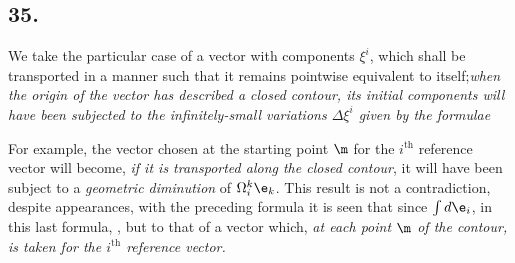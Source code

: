 \subsection*{35.}

We take the particular case of a vector with components $\xi^i$, which shall be transported in a manner such that it remains pointwise equivalent to itself;\textit{when the origin of the vector has described a closed contour, its initial components will have been subjected to the infinitely-small variations $\Delta\xi^i$ given by the formulae}

For example, the vector chosen at the starting point $\m$ for the $i^\text{th}$ reference vector will become, \textit{if it is transported  along the closed contour},
it will have been subject to a \textit{geometric diminution} of $\Omega_i^k \e_k$. This result is not a contradiction, despite appearances, with the preceding formula it is seen that
since $\int d\e_i$, in this last formula, , but to that of a vector which, \textit{at each point $\m$ of the contour, is taken for the $i^\text{th}$ reference vector.}

